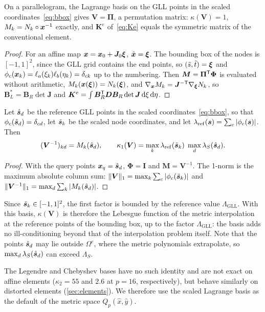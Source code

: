 \begin{lemma}\label{lem:affine}
On a parallelogram, the Lagrange basis on the GLL points in the scaled
coordinates~\eqref{eq:bbox} gives $\bm V=\bm\Pi$, a permutation matrix: $\kappa(\bm V)=1$,
$M_k=N_k\circ\bm{x}^{-1}$ exactly, and $\bm K^e$ of~\eqref{eq:Ke} equals the symmetric matrix of the
conventional element.
\end{lemma}
\begin{proof}
For an affine map $\bm{x}=\bm{x}_0+\bm J_0\bm{\xi}$, $\hat{\bm{x}}=\bm{\xi}$. The bounding box of the nodes is
$[-1,1]^2$, since the GLL grid contains the end points, so $(\tilde s,\tilde t)=\bm{\xi}$ and
$\phi_c(\bm{x}_k)=\ell_a(\xi_k)\ell_b(\eta_k)=\delta_{ck}$ up to the numbering. Then $\bm M=\bm
\Pi^{\mathsf{T}}\bm\Phi$ is evaluated without arithmetic, $M_k(\bm{x}(\bm{\xi}))=N_k(\bm{\xi})$, and
$\nabla_{\bm{x}}M_k=\bm J^{-\mathsf{T}}\nabla_{\bm{\xi}}N_k$, so $\bm B_L^\ast=\bm B_R\det\bm J$ and
$\bm K^e=\int\bm B_R^{\mathsf{T}}\bm D\bm B_R\det\bm J\,\mathrm{d}\xi\,\mathrm{d}\eta$.
\end{proof}

\begin{proposition}\label{prop:kappa}
Let $\hat{\bm{s}}_d$ be the reference GLL points in the scaled coordinates~\eqref{eq:bbox}, so that
$\phi_c(\hat{\bm{s}}_d)=\delta_{cd}$, let $\tilde{\bm{s}}_k$ be the scaled node coordinates, and let
$\lambda_{\mathrm{ref}}(\bm{s})=\sum_c|\phi_c(\bm{s})|$. Then
\begin{equation}
  (\bm V^{-1})_{kd}=M_k(\hat{\bm{s}}_d),\qquad
  \kappa_1(\bm V)=\max_k\lambda_{\mathrm{ref}}(\tilde{\bm{s}}_k)\;\max_d\lambda_S(\hat{\bm{s}}_d).
  \label{eq:kappa1}
\end{equation}
\end{proposition}
\begin{proof}
With the query points $\bm{x}_q=\hat{\bm{s}}_d$, $\bm\Phi=\bm I$ and $\bm M=\bm V^{-1}$. The 1-norm is the
maximum absolute column sum: $\|\bm V\|_1=\max_k\sum_c|\phi_c(\tilde{\bm{s}}_k)|$ and
$\|\bm V^{-1}\|_1=\max_d\sum_k|M_k(\hat{\bm{s}}_d)|$.
\end{proof}
Since $\tilde{\bm{s}}_k\in[-1,1]^2$, the first factor is bounded by the reference value
$\Lambda_{\mathrm{GLL}}$. With this basis, $\kappa(\bm V)$ is therefore the Lebesgue function of
the metric interpolation at the reference points of the bounding box, up to the factor
$\Lambda_{\mathrm{GLL}}$: the basis adds no ill-conditioning beyond that of the interpolation
problem itself. Note that the points $\hat{\bm{s}}_d$ may lie outside $\Omega^e$, where the metric
polynomials extrapolate, so $\max_d\lambda_S(\hat{\bm{s}}_d)$ can exceed $\Lambda_S$.

The Legendre and Chebyshev bases have no such identity and are not exact on affine elements
($\kappa_2=55$ and $2.6$ at $p=16$, respectively), but behave similarly on distorted elements
(\cref{sec:elements}). We therefore use the scaled Lagrange basis as the default of the metric
space $Q_p(\hat x,\hat y)$.
